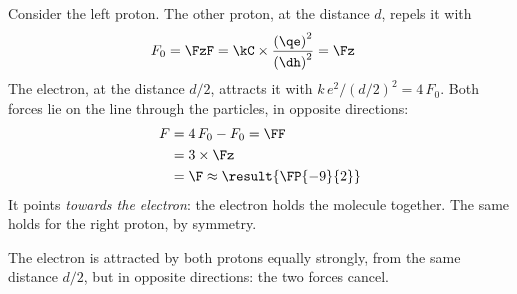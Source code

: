 \begin{abcliste}
\abc
\begin{center}
\end{center}
Consider the left proton. The other proton, at the distance $d$, repels it with
\begin{align}
 F_0 &= \FzF = \kC\times\frac{\left(\qe\right)^2}{\left(\dh\right)^2} = \Fz
\end{align}
The electron, at the distance $d/2$, attracts it with $k\,e^2/(d/2)^2 = 4\,F_0$. Both forces lie on the line through the particles, in opposite directions:
\begin{align}
 F &= 4\,F_0 - F_0 = \FF \\
   &= 3\times\Fz \\
   &= \F \approx \result{\FP{-9}{2}}
\end{align}
It points \emph{towards the electron}: the electron holds the molecule together. The same holds for the right proton, by symmetry.

\abc The electron is attracted by both protons equally strongly, from the same distance $d/2$, but in opposite directions: the two forces cancel.
\end{abcliste}
